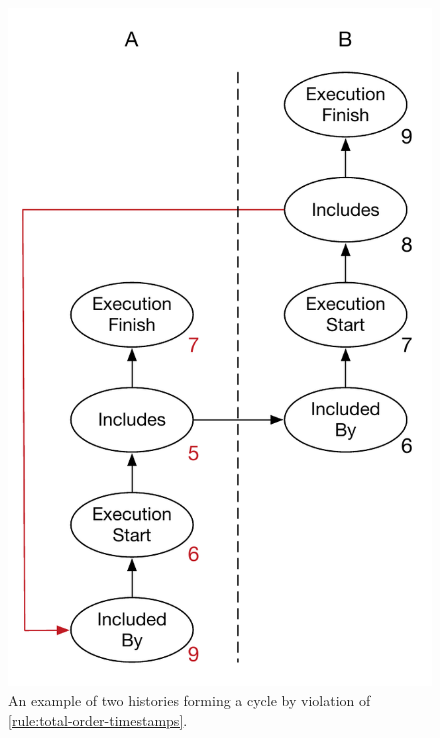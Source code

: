     \begin{figure}[H]
		\centering
    	\begin{minipage}{.45\textwidth}
			\includegraphics[width=.89\textwidth]{5validation/images/total-order-of-timestamps-cycle.pdf}
			\caption{An example of two histories forming a cycle by violation of \autoref{rule:total-order-timestamps}.}
			\label{fig:validation:total-order-of-timestamps-cycle}
    	\end{minipage}
		\hfill
		\begin{minipage}{.45\textwidth}

\end{minipage}
\end{figure}
